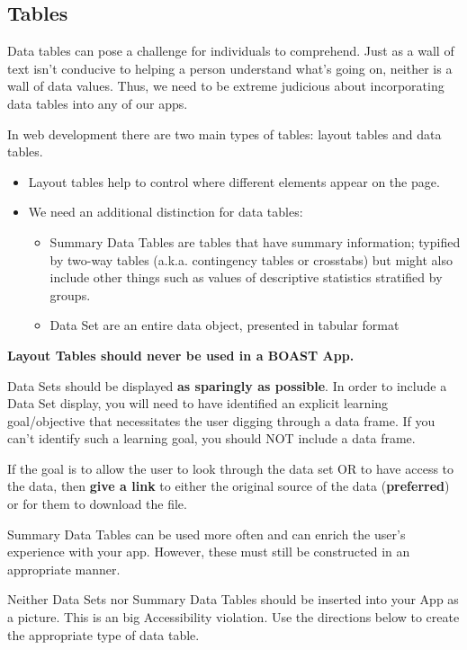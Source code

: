 \documentclass[
]{book}
\providecommand{\tightlist}{%
  \setlength{\itemsep}{0pt}\setlength{\parskip}{0pt}}
\begin{document}
\hypertarget{tables}{%
\subsection{Tables}\label{tables}}

Data tables can pose a challenge for individuals to comprehend. Just as a wall of text isn't conducive to helping a person understand what's going on, neither is a wall of data values. Thus, we need to be extreme judicious about incorporating data tables into any of our apps.

In web development there are two main types of tables: layout tables and data tables.

\begin{itemize}
\tightlist
\item
  Layout tables help to control where different elements appear on the page.
\item
  We need an additional distinction for data tables:

  \begin{itemize}
  \tightlist
  \item
    Summary Data Tables are tables that have summary information; typified by two-way tables (a.k.a. contingency tables or crosstabs) but might also include other things such as values of descriptive statistics stratified by groups.
  \item
    Data Set are an entire data object, presented in tabular format
  \end{itemize}
\end{itemize}

\textbf{Layout Tables should never be used in a BOAST App.}

Data Sets should be displayed \textbf{as sparingly as possible}. In order to include a Data Set display, you will need to have identified an explicit learning goal/objective that necessitates the user digging through a data frame. If you can't identify such a learning goal, you should NOT include a data frame.

If the goal is to allow the user to look through the data set OR to have access to the data, then \textbf{give a link} to either the original source of the data (\textbf{preferred}) or for them to download the file.

Summary Data Tables can be used more often and can enrich the user's experience with your app. However, these must still be constructed in an appropriate manner.

Neither Data Sets nor Summary Data Tables should be inserted into your App as a picture. This is an big Accessibility violation. Use the directions below to create the appropriate type of data table.
\end{document}
